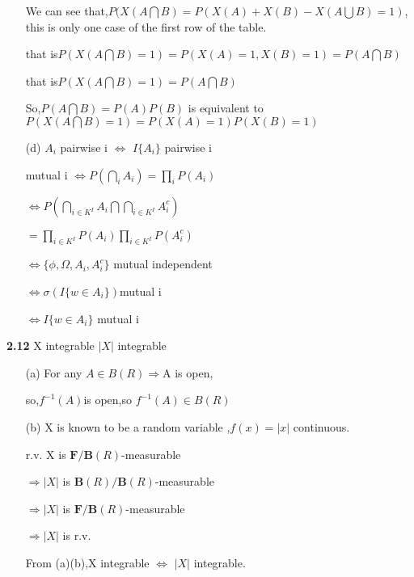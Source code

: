 \begin{enumerate}
We can see that,$P(X(A\bigcap B)=P(X(A)+X(B)-X(A\bigcup B) = 1)$, this is only one case of the first row of the table.

that is$P(X(A\bigcap B)=1)=P(X(A)=1,X(B)=1)=P(A\bigcap B)$

that is$P(X(A\bigcap B)=1)=P(A\bigcap B)$

So,$P(A\bigcap B)=P(A)P(B)$ is equivalent to $P(X(A\bigcap B)=1)=P(X(A)=1)P(X(B)=1)$

\item[(d)]$A_i$  pairwise i $\Leftrightarrow$ $I\{ A_i \}$  pairwise i

mutual i $\Leftrightarrow P(\bigcap_i A_i) = \prod_i P(A_i)$

$\Leftrightarrow P(\bigcap_{i\in K^I}A_i \bigcap \bigcap_{i\in K^I}A_i^c)$

$=\prod_{i\in K^I} P(A_i)\prod_{i\in K^I} P(A_i^c)$

$\Leftrightarrow \{\phi,\Omega,A_i,A_i^c\}$ mutual independent

$\Leftrightarrow  \sigma(I\{ w\in A_i\})$mutual i

$\Leftrightarrow I\{ w\in A_i\}$ mutual i

\end{enumerate}

\noindent\textbf{2.12} X integrable  $|X|$ integrable

\begin{enumerate}
    \item[(a)]For any $A\in B(R)\Rightarrow $A is open,

so,$f^{-1}(A)$is open,so $f^{-1}(A)\in B(R)$

\item[(b)]X is known to be a random variable ,$f(x)=|x|$ continuous.

r.v. X is $\textbf{F}/\textbf{B}(R)$-measurable

$\Rightarrow |X|$ is $\textbf{B}(R)/\textbf{B}(R)$-measurable

$\Rightarrow |X|$ is $\textbf{F}/\textbf{B}(R)$-measurable

$\Rightarrow |X|$ is r.v.

From (a)(b),X integrable $\Leftrightarrow$ $| X |$ integrable.
\end{enumerate}



